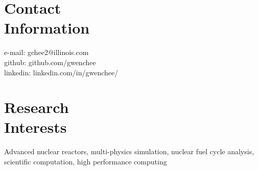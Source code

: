 \documentclass[margin,line]{resume}
\begin{document}
\begin{resume}

    \section{\mysidestyle Contact\\Information}
        e-mail: gchee2@illinois.com \vspace{0mm}\\\vspace{0mm}%
        github: github.com/gwenchee           \vspace{0mm}\\\vspace{0mm}%
        linkedin: linkedin.com/in/gwenchee/    \vspace{0mm}
    \section{\mysidestyle Research\\Interests}
		Advanced nuclear reactors, multi-physics
                simulation, nuclear fuel cycle analysis,
                scientific computation, high performance computing

\end{resume}
\end{document}
